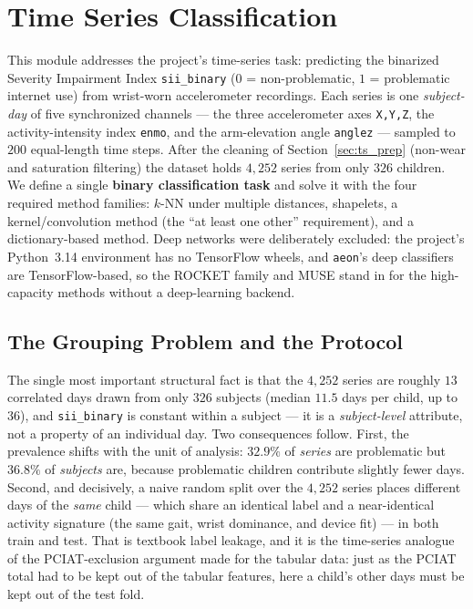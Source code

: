 \section{Time Series Classification}
\label{sec:ts}
This module addresses the project's time-series task: predicting the binarized Severity Impairment Index \texttt{sii\_binary} ($0$ = non-problematic, $1$ = problematic internet use) from wrist-worn accelerometer recordings. Each series is one \emph{subject-day} of five synchronized channels --- the three accelerometer axes \texttt{X,Y,Z}, the activity-intensity index \texttt{enmo}, and the arm-elevation angle \texttt{anglez} --- sampled to $200$ equal-length time steps. After the cleaning of Section~\ref{sec:ts_prep} (non-wear and saturation filtering) the dataset holds $4{,}252$ series from only $326$ children. We define a single \textbf{binary classification task} and solve it with the four required method families: $k$-NN under multiple distances, shapelets, a kernel/convolution method (the ``at least one other'' requirement), and a dictionary-based method. Deep networks were deliberately excluded: the project's Python~3.14 environment has no TensorFlow wheels, and \texttt{aeon}'s deep classifiers are TensorFlow-based, so the ROCKET family and MUSE stand in for the high-capacity methods without a deep-learning backend.

\subsection{The Grouping Problem and the Protocol}
The single most important structural fact is that the $4{,}252$ series are roughly $13$ correlated days drawn from only $326$ subjects (median $11.5$ days per child, up to $36$), and \texttt{sii\_binary} is constant within a subject --- it is a \emph{subject-level} attribute, not a property of an individual day. Two consequences follow. First, the prevalence shifts with the unit of analysis: $32.9\%$ of \emph{series} are problematic but $36.8\%$ of \emph{subjects} are, because problematic children contribute slightly fewer days. Second, and decisively, a naive random split over the $4{,}252$ series places different days of the \emph{same} child --- which share an identical label and a near-identical activity signature (the same gait, wrist dominance, and device fit) --- in both train and test. That is textbook label leakage, and it is the time-series analogue of the PCIAT-exclusion argument made for the tabular data: just as the PCIAT total had to be kept out of the tabular features, here a child's other days must be kept out of the test fold.

